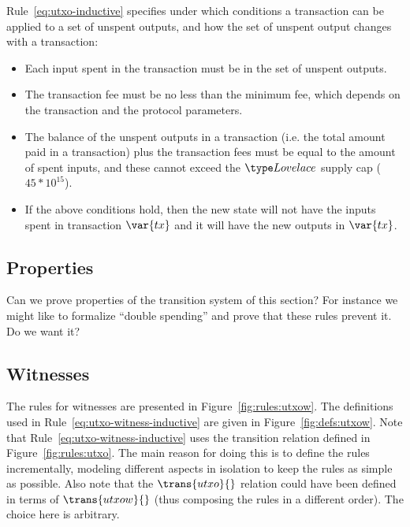 Rule~\ref{eq:utxo-inductive} specifies under which conditions a transaction can
be applied to a set of unspent outputs, and how the set of unspent output
changes with a transaction:
\begin{itemize}
\item Each input spent in the transaction must be in the set of unspent
  outputs.
\item The transaction fee must be no less than the minimum fee, which depends
  on the transaction and the protocol parameters.
\item The balance of the unspent outputs in a transaction (i.e. the total
  amount paid in a transaction) plus the transaction fees must be equal to the
  amount of spent inputs, and these cannot exceed the $\Lovelace$ supply cap
  ($45*10^{15}$).
\item If the above conditions hold, then the new state will not have the inputs
  spent in transaction $\var{tx}$ and it will have the new outputs in
  $\var{tx}$.
\end{itemize}

\subsection{Properties}
\label{sec:utxo-properties}

\begin{todo}
  Can we prove properties of the transition system of this section? For
  instance we might like to formalize ``double spending'' and prove that these
  rules prevent it. Do we want it?
\end{todo}

\clearpage

\subsection{Witnesses}
\label{sec:witnesses}

The rules for witnesses are presented in Figure~\ref{fig:rules:utxow}.
The definitions used in Rule~\ref{eq:utxo-witness-inductive} are given in
Figure~\ref{fig:defs:utxow}. Note that
Rule~\ref{eq:utxo-witness-inductive} uses the transition relation defined in
Figure~\ref{fig:rules:utxo}. The main reason for doing this is to define
the rules incrementally, modeling different aspects in isolation to keep the
rules as simple as possible. Also note that the $\trans{utxo}{}$ relation could
have been defined in terms of $\trans{utxow}{}$ (thus composing the rules in a
different order). The choice here is arbitrary.

